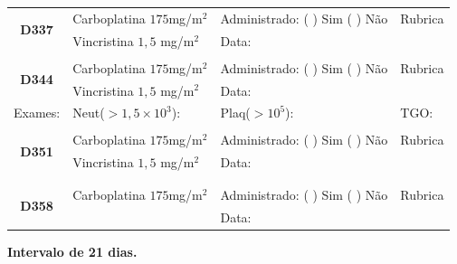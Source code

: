 \documentclass[11pt,a4paper,oldfontcommands]{memoir}
\begin{document}
\begin{center}
\begin{longtable}{p{1cm}p{4cm}|p{5cm}|p{3cm}}
    \hline
    \multicolumn{1}{c|}{\multirow{2}{*}{\textbf{D337}}}&{Carboplatina \(175\)mg/m\(^2\)}&{Administrado: (  ) Sim (  ) Não}&{Rubrica}\\
    \multicolumn{1}{c|}{}&{Vincristina \(1,5\) mg/m\(^2\)}&{Data:}&\\
    \hline
    \\
    \hline
    \multicolumn{1}{c|}{\multirow{2}{*}{\textbf{D344}}}&{Carboplatina \(175\)mg/m\(^2\)}&{Administrado: (  ) Sim (  ) Não}&{Rubrica}\\
    \multicolumn{1}{c|}{}&{Vincristina \(1,5\) mg/m\(^2\)}&{Data:}&\\
    \hline
    {\tiny{Exames:}}&{\tiny{Neut(\(>1,5\times10^3\)):}}&{\tiny{Plaq(\(>10^5\)):}}&{\tiny{TGO:}}
    \\
    \hline
    \\
    \hline
    \multicolumn{1}{c|}{\multirow{2}{*}{\textbf{D351}}}&{Carboplatina \(175\)mg/m\(^2\)}&{Administrado: (  ) Sim (  ) Não}&{Rubrica}\\
    \multicolumn{1}{c|}{}&{Vincristina \(1,5\) mg/m\(^2\)}&{Data:}&\\
    \hline\\[0.5cm]
    \\
    \hline
    \multicolumn{1}{c|}{\multirow{2}{*}{\textbf{D358}}}&{Carboplatina \(175\)mg/m\(^2\)}&{Administrado: (  ) Sim (  ) Não}&{Rubrica}\\
	\multicolumn{1}{c|}{}&&{Data:}&\\
    \hline
\end{longtable}
\textbf{Intervalo de 21 dias.}
\end{center}
\end{document}
